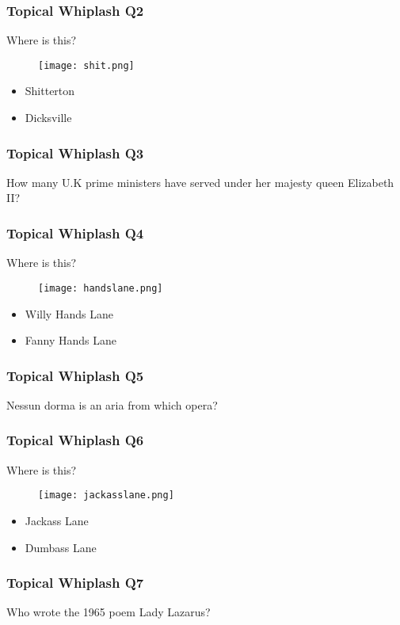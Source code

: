 \documentclass{beamer}
\begin{document}
\begin{frame}
\frametitle{Topical Whiplash Q2}
Where is this?
\begin{figure}[H]
\texttt{[image: shit.png]}
\end{figure}
\begin{itemize}
\item Shitterton
\item Dicksville
\end{itemize}


\end{frame}


\begin{frame}
\frametitle{Topical Whiplash Q3}
How many U.K prime ministers have served under her majesty queen Elizabeth II?

\end{frame}


\begin{frame}
\frametitle{Topical Whiplash Q4}
Where is this?
\begin{figure}[H]
\texttt{[image: handslane.png]}
\end{figure}
\begin{itemize}
\item Willy Hands Lane 
\item Fanny Hands Lane 
\end{itemize}


\end{frame}



\begin{frame}
\frametitle{Topical Whiplash Q5}
Nessun dorma is an aria from which opera?

\end{frame}

\begin{frame}
\frametitle{Topical Whiplash Q6}
Where is this?
\begin{figure}[H]
\texttt{[image: jackasslane.png]}
\end{figure}
\begin{itemize}
\item Jackass Lane
\item Dumbass Lane 
\end{itemize}


\end{frame}


\begin{frame}
\frametitle{Topical Whiplash Q7}
Who wrote the 1965 poem Lady Lazarus?

\end{frame}
\end{document}
